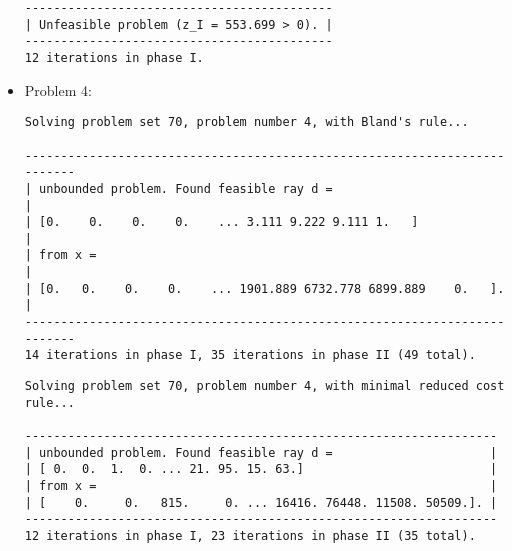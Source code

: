 \documentclass[a4paper]{article}
\begin{document}
\begin{itemize}
\begin{verbatim}
-------------------------------------------
| Unfeasible problem (z_I = 553.699 > 0). |
-------------------------------------------
12 iterations in phase I.
\end{verbatim}

\vspace{2ex}

    \item Problem 4:
\begin{verbatim}
Solving problem set 70, problem number 4, with Bland's rule...

--------------------------------------------------------------------------
| unbounded problem. Found feasible ray d =                              |
| [0.    0.    0.    0.    ... 3.111 9.222 9.111 1.   ]                  |
| from x =                                                               |
| [0.   0.    0.    0.    ... 1901.889 6732.778 6899.889    0.   ].      |
--------------------------------------------------------------------------
14 iterations in phase I, 35 iterations in phase II (49 total).

\end{verbatim}

\vspace{2ex}
\begin{verbatim}
Solving problem set 70, problem number 4, with minimal reduced cost rule...

------------------------------------------------------------------
| unbounded problem. Found feasible ray d =                      |
| [ 0.  0.  1.  0. ... 21. 95. 15. 63.]                          |
| from x =                                                       |
| [    0.     0.   815.     0. ... 16416. 76448. 11508. 50509.]. |
------------------------------------------------------------------
12 iterations in phase I, 23 iterations in phase II (35 total).
\end{verbatim}

\vspace{2ex}
\end{itemize}

\newpage
\end{document}
